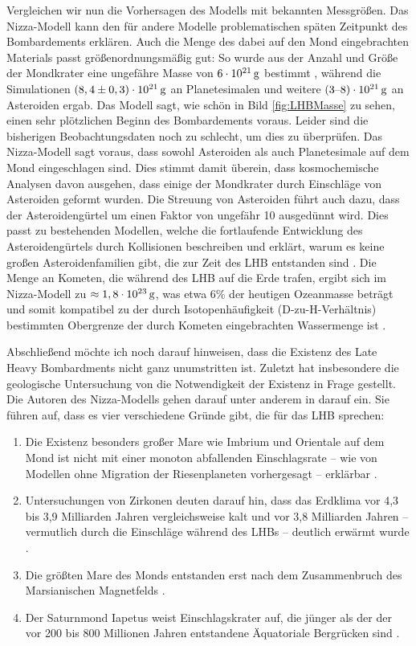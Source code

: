 \documentclass[12pt,a4paper,twoside,open=right,bibliography=totoc]{scrbook}
\renewcommand{\cite}{ \citep}
\begin{document}
Vergleichen wir nun die Vorhersagen des Modells mit bekannten Messgrößen. Das Nizza-Modell kann den für andere Modelle problematischen späten Zeitpunkt des Bombardements erklären. Auch die Menge des dabei auf den Mond eingebrachten Materials passt größenordnungsmäßig gut: So wurde aus der Anzahl und Größe der Mondkrater eine ungefähre Masse von $\unit[6 \cdot 10^{21}]{g}$ bestimmt\cite{Levison2001b,Gomes2005}, während die Simulationen $\unit[\left(8,4 \pm 0,3\right) \cdot 10^{21}]{g}$ an Planetesimalen und weitere $\unit[\left( 3\text{--}8 \right) \cdot 10^{21}]{g}$ an Asteroiden ergab.
Das Modell sagt, wie schön in Bild \ref{fig:LHBMasse} zu sehen, einen sehr plötzlichen Beginn des Bombardements voraus. Leider sind die bisherigen Beobachtungsdaten noch zu schlecht, um dies zu überprüfen.
Das Nizza-Modell sagt voraus, dass sowohl Asteroiden als auch Planetesimale auf dem Mond eingeschlagen sind. Dies stimmt damit überein, dass kosmochemische Analysen davon ausgehen, dass einige der Mondkrater durch Einschläge von Asteroiden geformt wurden.
Die Streuung von Asteroiden führt auch dazu, dass der Asteroidengürtel um einen Faktor von ungefähr 10 ausgedünnt wird. Dies passt zu bestehenden Modellen, welche die fortlaufende Entwicklung des Asteroidengürtels durch Kollisionen beschreiben und erklärt, warum es keine großen Asteroidenfamilien gibt, die zur Zeit des LHB entstanden sind\cite{Davis1994,Bottke2005,Gomes2005}.
Die Menge an Kometen, die während des LHB auf die Erde trafen, ergibt sich im Nizza-Modell zu $\approx \unit[1,8 \cdot 10^{23}]{g}$, was etwa 6\% der heutigen Ozeanmasse beträgt und somit kompatibel zu der durch Isotopenhäufigkeit (D-zu-H-Verhältnis) bestimmten Obergrenze der durch Kometen eingebrachten Wassermenge ist\cite{Morbidelli2000,Gomes2005}.

Abschließend möchte ich noch darauf hinweisen, dass die Existenz des Late Heavy Bombardments nicht ganz unumstritten ist. Zuletzt hat insbesondere die geologische Untersuchung von \cite{Spudis2011} die Notwendigkeit der Existenz in Frage gestellt. Die Autoren des Nizza-Modells gehen darauf unter anderem in \cite{Brasser2009} darauf ein. Sie führen auf, dass es vier verschiedene Gründe gibt, die für das LHB sprechen:
\begin{enumerate}
\item Die Existenz besonders großer Mare wie Imbrium und Orientale auf dem Mond ist nicht mit einer monoton abfallenden Einschlagsrate -- wie von Modellen ohne Migration der Riesenplaneten vorhergesagt -- erklärbar \cite{Bottke2007}.
\item Untersuchungen von Zirkonen deuten darauf hin, dass das Erdklima vor 4,3 bis 3,9 Milliarden Jahren vergleichsweise kalt und vor 3,8 Milliarden Jahren -- vermutlich durch die Einschläge während des LHBs -- deutlich erwärmt wurde\cite{Mojzsis2001,Trail2007}.
\item Die größten Mare des Monds entstanden erst nach dem Zusammenbruch des Marsianischen Magnetfelds \cite{Lillis2006,Lillis2007}.
\item Der Saturnmond Iapetus weist Einschlagskrater auf, die jünger als der der vor 200 bis 800 Millionen Jahren entstandene Äquatoriale Bergrücken sind\cite{Castillo-Rogez2007}.
\end{enumerate}
\end{document}

